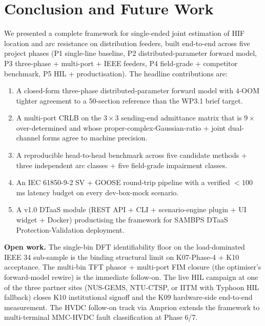 \documentclass[journal]{IEEEtran}
\begin{document}
\section{Conclusion and Future Work}\label{sec:conclusion}

We presented a complete framework for single-ended joint
estimation of HIF location and arc resistance on distribution
feeders, built end-to-end across five project phases (P1
single-line baseline, P2 distributed-parameter forward model,
P3 three-phase + multi-port + IEEE feeders, P4 field-grade +
competitor benchmark, P5 HIL + productisation).  The headline
contributions are:
\begin{enumerate}
\item A closed-form three-phase distributed-parameter forward
      model with $4$-OOM tighter agreement to a 50-section
      reference than the WP3.1 brief target.
\item A multi-port CRLB on the $3 \times 3$ sending-end
      admittance matrix that is $9\times$ over-determined and
      whose proper-complex-Gaussian-ratio + joint dual-channel
      forms agree to machine precision.
\item A reproducible head-to-head benchmark across five
      candidate methods + three independent arc classes + five
      field-grade impairment classes.
\item An IEC 61850-9-2 SV + GOOSE round-trip pipeline with a
      verified $< 100$\,ms latency budget on every dev-box-mock
      scenario.
\item A v1.0 DTaaS module (REST API + CLI + scenario-engine
      plugin + UI widget + Docker) productising the framework
      for SAMBPS DTaaS Protection-Validation deployment.
\end{enumerate}

\textbf{Open work.}  The single-bin DFT identifiability floor
on the load-dominated IEEE 34 sub-sample is the binding
structural limit on K07-Phase-4 + K10 acceptance.  The
multi-bin TFT phasor + multi-port FIM closure (the optimiser's
forward-model rewire) is the immediate follow-on.  The live
HIL campaign at one of the three partner sites (NUS-GEMS,
NTU-CTSP, or IITM with Typhoon HIL fallback) closes K10
institutional signoff and the K09 hardware-side end-to-end
measurement.  The HVDC follow-on track via Amprion
extends the framework to multi-terminal MMC-HVDC fault
classification at Phase 6/7.



\end{document}

